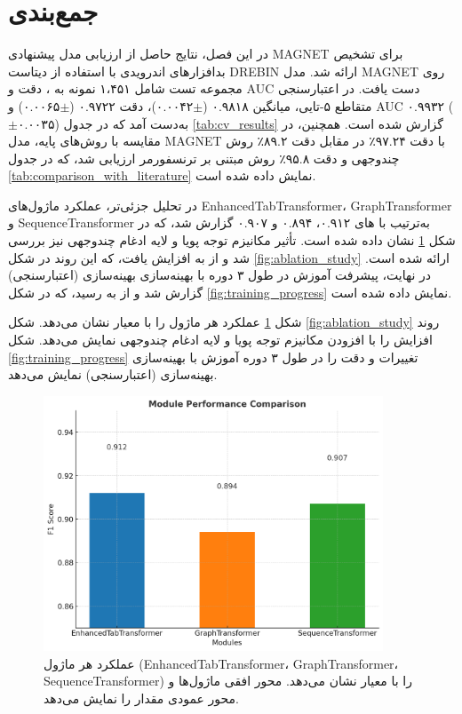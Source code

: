 \section{جمع‌بندی}
در این فصل، نتایج حاصل از ارزیابی مدل پیشنهادی MAGNET برای تشخیص بدافزارهای اندرویدی با استفاده از دیتاست DREBIN \cite{Drebin} ارائه شد. مدل MAGNET روی مجموعه تست شامل ۱،۴۵۱ نمونه به  ، دقت  و AUC  دست یافت. در اعتبارسنجی متقاطع ۵-تایی، میانگین  ۰.۹۸۱۸ ($\pm$۰.۰۰۴۲)، دقت ۰.۹۷۲۲ ($\pm$۰.۰۰۶۵) و AUC ۰.۹۹۳۲ ($\pm$۰.۰۰۳۵) به‌دست آمد که در جدول \ref{tab:cv_results} گزارش شده است. همچنین، در مقایسه با روش‌های پایه، مدل MAGNET با دقت ۹۷.۲۴٪ در مقابل دقت ۸۹.۲٪ روش چندوجهی \cite{Alsaleh2023} و دقت ۹۵.۸٪ روش مبتنی بر ترنسفورمر \cite{TransformerMalware} ارزیابی شد، که در جدول \ref{tab:comparison_with_literature} نمایش داده شده است.

در تحلیل جزئی‌تر، عملکرد ماژول‌های EnhancedTabTransformer، GraphTransformer و SequenceTransformer به‌ترتیب با های ۰.۹۱۲، ۰.۸۹۴ و ۰.۹۰۷ گزارش شد، که در شکل \ref{fig:module_comparison} نشان داده شده است. تأثیر مکانیزم توجه پویا و لایه ادغام چندوجهی نیز بررسی شد و  از  به  افزایش یافت، که این روند در شکل \ref{fig:ablation_study} ارائه شده است. در نهایت، پیشرفت آموزش در طول ۳ دوره با بهینه‌سازی بهینه‌سازی (اعتبارسنجی) گزارش شد و  از  به  رسید، که در شکل \ref{fig:training_progress} نمایش داده شده است.

شکل \ref{fig:module_comparison} عملکرد هر ماژول را با معیار  نشان می‌دهد. شکل \ref{fig:ablation_study} روند افزایش  را با افزودن مکانیزم توجه پویا و لایه ادغام چندوجهی نمایش می‌دهد. شکل \ref{fig:training_progress} تغییرات  و دقت را در طول ۳ دوره آموزش با بهینه‌سازی بهینه‌سازی (اعتبارسنجی) نمایش می‌دهد.

\begin{figure}[h!]
\centering
\includegraphics[width=0.9\textwidth]{images/fig_module_comparison_en}
\caption{عملکرد هر ماژول (EnhancedTabTransformer، GraphTransformer، SequenceTransformer) را با معیار  نشان می‌دهد. محور افقی ماژول‌ها و محور عمودی مقدار  را نمایش می‌دهد.}
\label{fig:module_comparison}
\end{figure}

